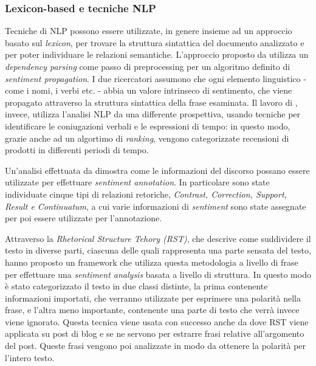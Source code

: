 \documentclass[a4paper,12pt,openright,twoside]{report}
\theoremstyle{definition}
\begin{document}
\subsubsection{Lexicon-based e tecniche NLP}
Tecniche di NLP possono essere utilizzate, in genere insieme ad un approccio basato sul \emph{lexicon}, per 
trovare la struttura sintattica del documento analizzato e per poter individuare le relazioni semantiche.
L'approccio proposto da \cite{Caro2012}
utilizza un \emph{dependency parsing} come passo di preprocessing per un algoritmo definito di \emph{sentiment propagation}.
I due ricercatori assumono che ogni elemento linguistico - come i nomi, i verbi etc. - abbia un valore intrinseco di
sentimento, che viene propagato attraverso la struttura sintattica della frase esaminata.
Il lavoro di \cite{Min2012}, invece,
utilizza l'analisi NLP da una differente prospettiva, usando tecniche per identificare le coniugazioni
verbali e le espressioni di tempo: in questo modo, grazie anche ad un algortimo di \emph{ranking}, vengono categorizzate
recensioni di prodotti in differenti periodi di tempo.

Un'analisi effettuata da \cite{Asher2008}
dimostra come le informazioni del discorso possano essere utilizzate per effettuare \emph{sentiment annotation}. In particolare
sono state individuate cinque tipi di relazioni retoriche, \emph{Contrast, Correction, Support, Result e Continuatum},
a cui varie informazioni di \emph{sentiment} sono state assegnate per poi essere utilizzate per l'annotazione.

Attraverso la \emph{Rhetorical Structure Tehory (RST)}, che descrive come suddividere il testo in diverse parti, ciascuna
delle quali rappresenta una parte sensata del testo, \cite{Heer2011}
hanno proposto un framework che utilizza questa metodologia  a livello di frase per effettuare una \emph{sentiment analysis}
basata a livello di struttura. In questo modo è stato categorizzato il testo in due classi distinte, la prima
contenente
informazioni importati, che verranno utilizzate per esprimere una polarità nella frase, e l'altra 
meno importante, contenente una parte di testo che verrà
invece viene ignorato.
Questa tecnica viene usata con successo anche da \cite{Chenlo2013}
dove RST viene applicata su post di blog e se ne servono per estrarre frasi relative all'argomento del post. Queste frasi
vengono poi analizzate in modo da ottenere la polarità per l'intero testo.
\end{document}
